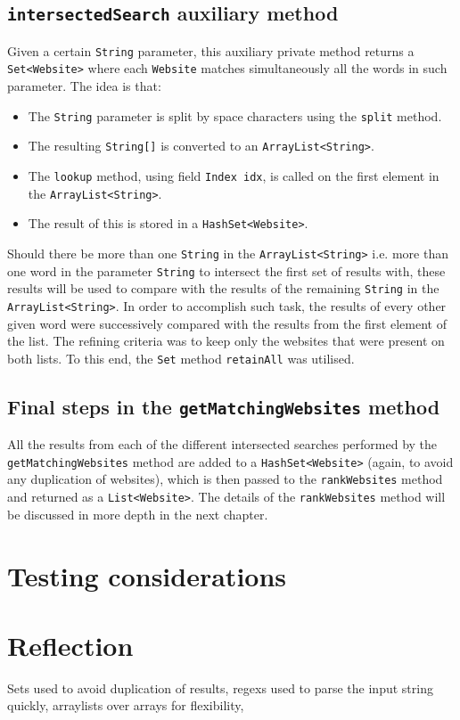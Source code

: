 \subsection{{\tt intersectedSearch} auxiliary method}
Given a certain {\tt String} parameter, this auxiliary private method returns a {\tt Set<Website>} where each {\tt Website} matches simultaneously all the words in such parameter. The idea is that:
\begin{itemize}
\item The {\tt String} parameter is split by space characters using the {\tt split} method.
\item The resulting {\tt String[]} is converted to an {\tt ArrayList<String>}.
\item The {\tt lookup} method, using field {\tt Index idx}, is called on the first element in the {\tt ArrayList<String>}.
\item The result of this is stored in a {\tt HashSet<Website>}.
\end{itemize}
Should there be more than one {\tt String} in the {\tt ArrayList<String>} i.e. more than one word in the parameter {\tt String} to intersect the first set of results with, these results will be used to compare with the results of the remaining {\tt String} in the {\tt ArrayList<String>}. In order to accomplish such task, the results of every other given word were successively compared with the results from the first element of the list. The refining criteria was to keep only the websites that were present on both lists.
To this end, the {\tt Set} method {\tt retainAll} was utilised.
\subsection{Final steps in the {\tt getMatchingWebsites} method}
All the results from each of the different intersected searches performed by the {\tt getMatchingWebsites} method are added to a {\tt HashSet<Website>} (again, to avoid any duplication of websites), which is then passed to the {\tt rankWebsites} method and returned as a {\tt List<Website>}. The details of the {\tt rankWebsites} method will be discussed in more depth in the next chapter.

\section{Testing considerations} %

\section{Reflection} %
Sets used to avoid duplication of results, regexs used to parse the input string quickly, arraylists over arrays for flexibility,